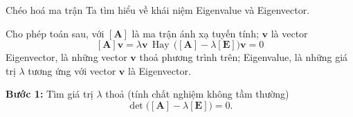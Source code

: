 \begin{frame}{Chéo hoá ma trận}
    Ta tìm hiểu về khái niệm Eigenvalue và Eigenvector. \cite{gilbert2009introduction}
    \vspace{2mm}

    Cho phép toán sau, với \(\mathbf{[A]}\) là ma trận ánh xạ tuyến tính; \(\mathbf{v}\) là vector
    \begin{equation}
        \mathbf{[A]} \mathbf{v} = \lambda \mathbf{v} \ \ \text{Hay} \ \ \Big( \mathbf{[A]} - \lambda \mathbf{[E]} \Big) \mathbf{v} = 0
        \label{eq:3.4_3}
    \end{equation}
    Eigenvector, là những vector \(\mathbf{v}\) thoả phương trình trên; Eigenvalue, là những giá trị \(\lambda\) tương ứng với vector \(\mathbf{v}\) là Eigenvector.
    \vspace{2mm}

    \textbf{Bước 1:} Tìm giá trị \(\lambda\) thoả (tính chất nghiệm không tầm thường)
    \begin{equation}
        \det \Big( \mathbf{[A]} - \lambda \mathbf{[E]} \Big) = 0.
        \label{eq:3.4_4}
    \end{equation}
\end{frame}
